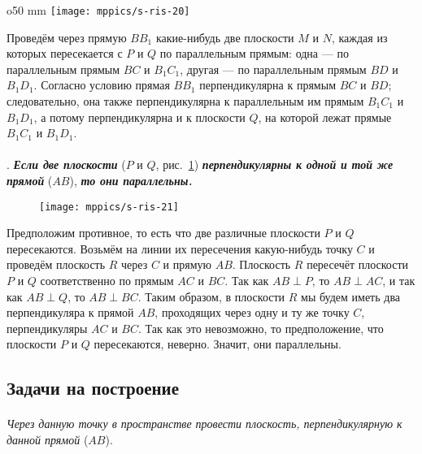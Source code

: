 \begin{wrapfigure}{o}{50 mm}
\centering
\texttt{[image: mppics/s-ris-20]}
\caption{}\label{1938/s-ris-20}
\end{wrapfigure}

Проведём через прямую $BB_1$ какие-нибудь две плоскости $M$ и $N$, каждая из которых пересекается с $P$ и $Q$ по параллельным прямым: одна — по параллельным прямым $BC$ и $B_1C_1$, другая — по параллельным прямым $BD$ и $B_1D_1$.
Согласно условию прямая $BB_1$ перпендикулярна к прямым $BC$ и $BD$;
следовательно, она также перпендикулярна к параллельным им прямым $B_1C_1$ и $B_1D_1$, а потому перпендикулярна и к плоскости $Q$, на которой лежат прямые $B_1C_1$ и $B_1D_1$.

\paragraph{}\label{1938/s34}
.
\textbf{\emph{Если две плоскости}} ($P$ и $Q$, рис.~\ref{1938/s-ris-21}) \textbf{\emph{перпендикулярны к одной и той же прямой}} ($AB$), \textbf{\emph{то они параллельны.}}

\begin{figure}[h!]
\centering
\texttt{[image: mppics/s-ris-21]}
\caption{}\label{1938/s-ris-21}
\end{figure}

Предположим противное, то есть что две различные плоскости $P$ и $Q$ пересекаются.
Возьмём на линии их пересечения какую-нибудь точку $C$ и проведём плоскость $R$ через $C$ и прямую $AB$.
Плоскость $R$ пересечёт плоскости $P$ и $Q$ соответственно по прямым $AC$ и $BC$.
Так как $AB\perp P$, то $AB\perp AC$, и так как $AB\perp Q$, то $AB\perp BC$.
Таким образом, в плоскости $R$ мы будем иметь два перпендикуляра к прямой $AB$, проходящих через одну и ту же точку $C$, перпендикуляры $AC$ и $BC$.
Так как это невозможно, то предположение, что плоскости $P$ и $Q$ пересекаются, неверно.
Значит, они параллельны.

\subsection*{Задачи на построение}

\paragraph{}\label{1938/s35}
\emph{Через данную точку в пространстве провести плоскость, перпендикулярную к данной прямой} ($AB$).

